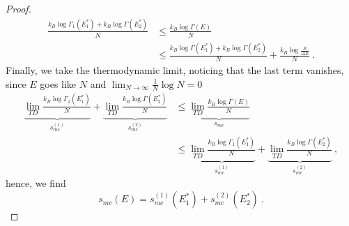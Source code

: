 \begin{proof}
\begin{equation*}
        \end{equation*}
        \begin{equation*}
        \begin{aligned}
            \frac{k_B \log \Gamma_1(E^*_1) + k_B \log \Gamma(E^*_2)}{N} & \leq \frac{k_B \log \Gamma(E)}{N} \\ & \leq \frac{k_B \log \Gamma(E^*_1) + k_B \log \Gamma(E^*_2)}{N} + \frac{k_B \log \frac{E}{\Delta E}}{N} ~.
        \end{aligned}
        \end{equation*}
        Finally, we take the thermodynamic limit, noticing that the last term vanishes, since $E$ goes like $N$ and $\lim_{N \rightarrow \infty} \frac{1}{N} \log N = 0$
        \begin{equation*}
        \begin{aligned}
            \underbrace{\lim_{TD} \frac{k_B \log \Gamma_1(E^*_1)}{N}}_{s_{mc}^{(1)}} + \underbrace{\lim_{TD} \frac{k_B \log \Gamma(E^*_2)}{N}}_{s_{mc}^{(2)}} & \leq \underbrace{\lim_{TD} \frac{k_B \log \Gamma(E)}{N}}_{s_{mc}} \\ & \leq \underbrace{\lim_{TD} \frac{k_B \log \Gamma_1(E^*_1)}{N}}_{s_{mc}^{(1)}} + \underbrace{\lim_{TD} \frac{k_B \log \Gamma(E^*_2)}{N}}_{s_{mc}^{(2)}} ~,
        \end{aligned}
        \end{equation*}
        hence, we find
        \begin{equation}\label{proof3}
            s_{mc}(E) = s_{mc}^{(1)} (E_1^*) + s_{mc}^{(2)} (E_2^*) ~.
        \end{equation}
    \end{proof}


